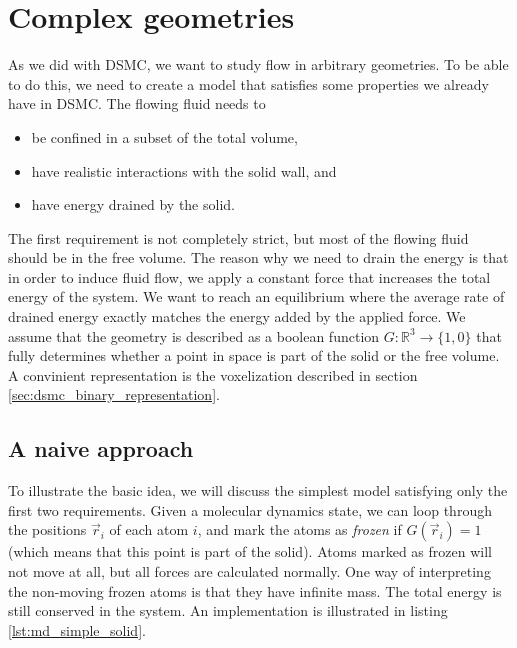 \section{Complex geometries}
\label{sec:md_complex_geometries}
As we did with DSMC, we want to study flow in arbitrary geometries.  To be able to do this, we need to create a model that satisfies some properties we already have in DSMC. The flowing fluid needs to
\begin{itemize}
	\item be confined in a subset of the total volume,
	\item have realistic interactions with the solid wall, and
	\item have energy drained by the solid.
\end{itemize}
The first requirement is not completely strict, but most of the flowing fluid should be in the free volume. The reason why we need to drain the energy is that in order to induce fluid flow, we apply a constant force that increases the total energy of the system. We want to reach an equilibrium where the average rate of drained energy exactly matches the energy added by the applied force. We assume that the geometry is described as a boolean function $G : \mathbb{R}^3\rightarrow \{1,0\}$ that fully determines whether a point in space is part of the solid or the free volume. A convinient representation is the voxelization described in section \ref{sec:dsmc_binary_representation}. 
\subsection{A naive approach}
To illustrate the basic idea, we will discuss the simplest model satisfying only the first two requirements. Given a molecular dynamics state, we can loop through the positions $\vec r_i$ of each atom $i$, and mark the atoms as \textit{frozen} if $G(\vec r_i) = 1$ (which means that this point is part of the solid). Atoms marked as frozen will not move at all, but all forces are calculated normally. One way of interpreting the non-moving frozen atoms is that they have infinite mass. The total energy is still conserved in the system. An implementation is illustrated in listing \ref{lst:md_simple_solid}.

